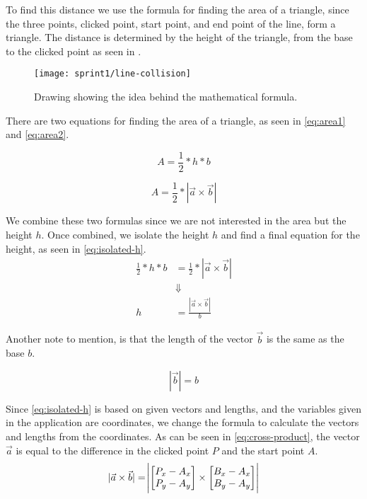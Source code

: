 To find this distance we use the formula for finding the area of a triangle, since the three points, clicked point, start point, and end point of the line, form a triangle.
The distance is determined by the height of the triangle, from the base to the clicked point as seen in .
\begin{figure}[h]
	\centering
	\texttt{[image: sprint1/line-collision]}
	\caption{Drawing showing the idea behind the mathematical formula.}
	\label{figure:line-collision}
\end{figure}

There are two equations for finding the area of a triangle, as seen in \eqref{eq:area1} and \eqref{eq:area2}.

\begin{equation}\label{eq:area1}
	A = \frac{1}{2}*h*b
\end{equation}

\begin{equation}\label{eq:area2}
	A =  \frac{1}{2}*|\vec{a} \times \vec{b}|
\end{equation}

We combine these two formulas since we are not interested in the area but the height $h$.
Once combined, we isolate the height $h$ and find a final equation for the height, as seen in \eqref{eq:isolated-h}.
\begin{equation}\label{eq:isolated-h}
\begin{aligned}
	\frac{1}{2}*h*b &=  \frac{1}{2}*|\vec{a} \times \vec{b}|\\
	& \Downarrow \\
	h &=  \frac{|\vec{a} \times \vec{b}|}{b}
\end{aligned}
\end{equation}

Another note to mention, is that the length of the vector $\vec{b}$ is the same as the base $b$.

\begin{equation*}
	|\vec{b}| = b
\end{equation*}

Since \eqref{eq:isolated-h} is based on given vectors and lengths, and the variables given in the application are coordinates, we change the formula to calculate the vectors and lengths from the coordinates.
As can be seen in \eqref{eq:cross-product}, the vector $\vec{a}$ is equal to the difference in the clicked point $P$ and the start point $A$.
\begin{equation}\label{eq:cross-product}
	|\vec{a} \times \vec{b}| =\abs{ 
	\begin{bmatrix}
		P_x-A_x \\
		P_y-A_y
	\end{bmatrix}
	\times
	\begin{bmatrix}
		B_x-A_x \\
		B_y-A_y
	\end{bmatrix}}
\end{equation}

